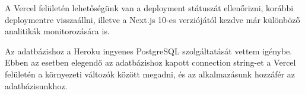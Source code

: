 A Vercel felületén lehetőségünk van a deployment státuszát ellenőrizni, korábbi deploymentre visszaállni, illetve a Next.js 10-es verziójától kezdve
már különböző analitikák monitorozására is.

Az adatbázishoz a Heroku ingyenes PostgreSQL szolgáltatását vettem igénybe. Ebben az esetben elegendő az adatbázishoz kapott
connection string-et a Vercel felületén a környezeti változók között megadni, és az alkalmazásunk hozzáfér az adatbázisunkhoz.
